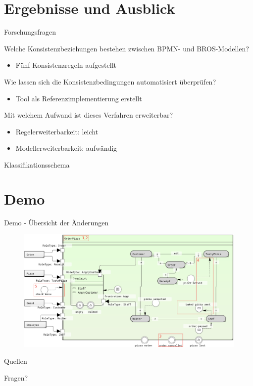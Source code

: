 \section{Ergebnisse und Ausblick}

\begin{frame}{Forschungsfragen}
  \begin{description}[4cm]
    \item[F1] Welche Konsistenzbeziehungen bestehen zwischen BPMN- und BROS-Modellen?
    \begin{itemize}
      \item Fünf Konsistenzregeln aufgestellt
    \end{itemize}

    \item[F2] Wie lassen sich die Konsistenzbedingungen automatisiert überprüfen?
    \begin{itemize}
      \item Tool als Referenzimplementierung erstellt
    \end{itemize}

    \item[F3] Mit welchem Aufwand ist dieses Verfahren erweiterbar?
    \begin{itemize}
      \item Regelerweiterbarkeit: leicht
      \item Modellerweiterbarkeit: aufwändig
    \end{itemize}
  \end{description}
\end{frame}

\begin{frame}{Klassifikationsschema}
  
\end{frame}

\section{Demo}

\begin{frame}{Demo - Übersicht der Änderungen}
  \begin{figure}
    \centering
    \begin{adjustbox}{width=0.9\linewidth,center}
      \includegraphics{images/example/bros-rule6H.png}
    \end{adjustbox}
  \end{figure}
\end{frame}

\begin{frame}[allowframebreaks]{Quellen}
  \printbibliography[heading=none]
\end{frame}

\begin{frame}[standout]
  Fragen?
\end{frame}
